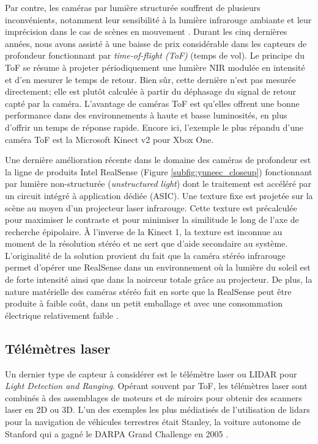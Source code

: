 Par contre, les caméras par lumière structurée souffrent de plusieurs inconvénients, notamment leur sensibilité à la lumière infrarouge ambiante et leur imprécision dans le cas de scènes en mouvement \citep{khoshelham2012}. Durant les cinq dernières années, nous avons assisté à une baisse de prix considérable dans les capteurs de profondeur fonctionnant par \textit{time-of-flight (ToF)} (temps de vol). Le principe du ToF se résume à projeter périodiquement une lumière NIR modulée en intensité et d'en mesurer le temps de retour. Bien sûr, cette dernière n'est pas mesurée directement; elle est plutôt calculée à partir du déphasage du signal de retour capté par la caméra. L'avantage de caméras ToF est qu'elles offrent une bonne performance dans des environnements à haute et basse luminosités, en plus d'offrir un temps de réponse rapide. Encore ici, l'exemple le plus répandu d'une caméra ToF est la Microsoft Kinect v2 pour Xbox One.

Une dernière amélioration récente dans le domaine des caméras de profondeur est la ligne de produits Intel RealSense (Figure \ref{subfig:yuneec_closeup}) fonctionnant par lumière non-structurée (\emph{unstructured light}) dont le traitement est accéléré par un circuit intégré à application dédiée (ASIC). Une texture fixe est projetée sur la scène au moyen d'un projecteur laser infrarouge. Cette texture est précalculée pour maximiser le contraste et pour minimiser la similitude le long de l'axe de recherche épipolaire. À l'inverse de la Kinect 1, la texture est inconnue au moment de la résolution stéréo et ne sert que d'aide secondaire au système. L'originalité de la solution provient du fait que la caméra stéréo infrarouge permet d'opérer une RealSense dans un environnement où la lumière du soleil est de forte intensité ainsi que dans la noirceur totale grâce au projecteur. De plus, la nature matérielle des caméras stéréo fait en sorte que la RealSense peut être produite à faible coût, dans un petit emballage et avec une consommation électrique relativement faible \citep{Keselman_2017_CVPR_Workshops}.

\subsection{Télémètres laser}

Un dernier type de capteur à considérer est le télémètre laser ou LIDAR pour \textit{Light Detection and Ranging}. Opérant souvent par ToF, les télémètres laser sont combinés à des assemblages de moteurs et de miroirs pour obtenir des scanners laser en 2D ou 3D. L'un des exemples les plus médiatisés de l'utilisation de lidars pour la navigation de véhicules terrestres était Stanley, la voiture autonome de Stanford qui a gagné le DARPA Grand Challenge en 2005 \citep{thrun2006stanley}.

